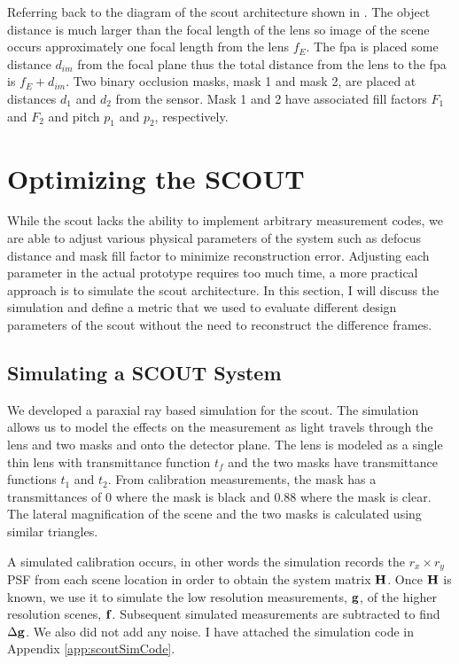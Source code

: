 Referring back to the diagram of the \gls{scout} architecture shown in . The object distance is much larger than the focal length of the lens so image of the scene occurs approximately one focal length from the lens $f_E$. The \gls{fpa} is placed some distance $d_{im}$ from the focal plane thus the total distance from the lens to the \gls{fpa} is $f_E + d_{im}$. Two binary occlusion masks, mask 1 and mask 2, are placed at distances $d_1$ and $d_2$ from the sensor. Mask 1 and 2 have associated fill factors $F_1$ and $F_2$ and pitch $p_1$ and $p_2$, respectively. 


\section{Optimizing the SCOUT}\label{sec:ScoutSimulations}

While the \gls{scout} lacks the ability to implement arbitrary measurement codes, we are able to adjust various physical parameters of the system such as defocus distance and mask fill factor to minimize reconstruction error. Adjusting each parameter in the actual prototype requires too much time, a more practical approach is to simulate the \gls{scout} architecture. In this section, I will discuss the simulation and define a metric that we used to evaluate different design parameters of the \gls{scout} without the need to reconstruct the difference frames. 

\subsection{Simulating a SCOUT System}

We developed a paraxial ray based simulation for the \gls{scout}. The simulation allows us to model the effects on the measurement as light travels through the lens and two masks and onto the detector plane. The lens is modeled as a single thin lens with transmittance function $t_f$ and the two masks have transmittance functions $t_1$ and $t_2$. From calibration measurements, the mask has a transmittances of $0$ where the mask is black and $0.88$ where the mask is clear. The lateral magnification of the scene and the two masks is calculated using similar triangles.

A simulated calibration occurs, in other words the simulation records the $r_x \times r_y$ PSF from each scene location in order to obtain the system matrix $\displaystyle \mathbf{H}$. Once $\displaystyle \mathbf{H}$ is known, we use it to simulate the low resolution measurements, $\displaystyle \mathbf{g}$, of the higher resolution scenes, $\displaystyle \mathbf{f}$. Subsequent simulated measurements are subtracted to find $\Delta \displaystyle \mathbf{g}$. We also did not add any noise. I have attached the simulation code in Appendix \ref{app:scoutSimCode}.


